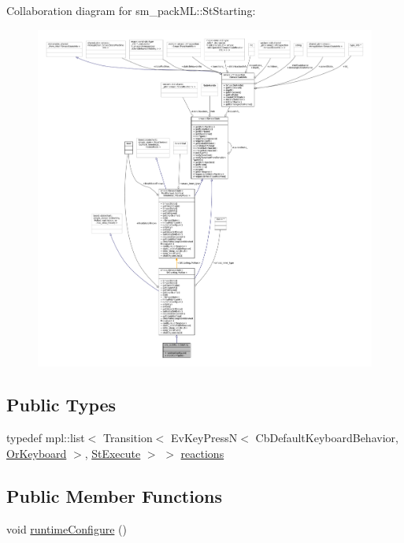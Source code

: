 Collaboration diagram for sm\+\_\+pack\+ML\+:\+:St\+Starting\+:
\nopagebreak
\begin{figure}[H]
\begin{center}
\leavevmode
\includegraphics[width=350pt]{structsm__packML_1_1StStarting__coll__graph}
\end{center}
\end{figure}
\subsection*{Public Types}
\begin{DoxyCompactItemize}
\item 
typedef mpl\+::list$<$ Transition$<$ Ev\+Key\+PressN$<$ Cb\+Default\+Keyboard\+Behavior, \hyperlink{classsm__packML_1_1OrKeyboard}{Or\+Keyboard} $>$, \hyperlink{structsm__packML_1_1StExecute}{St\+Execute} $>$ $>$ \hyperlink{structsm__packML_1_1StStarting_a9e71c6c4aafa4a6ee4b35666cc953a4d}{reactions}
\end{DoxyCompactItemize}
\subsection*{Public Member Functions}
\begin{DoxyCompactItemize}
\item 
void \hyperlink{structsm__packML_1_1StStarting_a5fa3513fd8240842dbad5d1c0c101949}{runtime\+Configure} ()
\end{DoxyCompactItemize}
